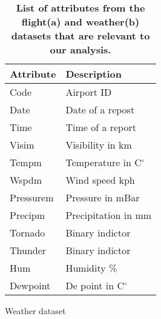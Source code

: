 \begin{table*}[!htb]
  \begin{subtable}{.5\linewidth}
    \centering
    \begin{tabular}[t]{|l|l|}
      \hline
      \bf{Attribute} & \bf{Description}           \\ \hline
      Code           & Airport ID                 \\ \hline
      Date	         & Date of a repost           \\ \hline
      Time           & Time of a report           \\ \hline
      Visim          & Visibility in km           \\ \hline
      Tempm          & Temperature in C$^{\circ}$ \\ \hline
      Wspdm          & Wind speed kph             \\ \hline
      Pressurem      & Pressure in mBar           \\ \hline
      Precipm        & Precipitation in mm        \\ \hline
      Tornado        & Binary indictor            \\ \hline
      Thunder        & Binary indictor            \\ \hline
      Hum            & Humidity \%                \\ \hline
      Dewpoint & De point in  C$^{\circ}$ \\ \hline
    \end{tabular}
    \caption{Weather dataset}
  \end{subtable}
\vspace{-0.1cm}
\caption{\bf{List of attributes from the flight(a) and weather(b)  datasets that are relevant to our analysis.}}
\label{tab:attlist}
\end{table*}
\vspace{-0.1cm}



